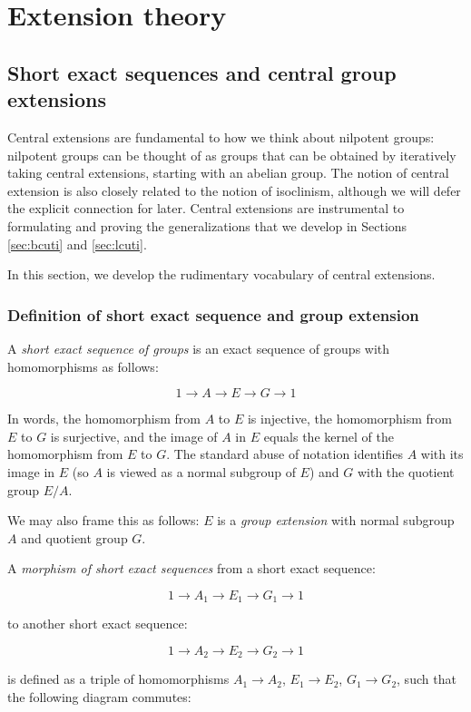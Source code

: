 \documentclass{ucetd}
\begin{document}
\chapter{Extension theory}

\section{Short exact sequences and central group extensions}\label{sec:ses-group}

Central extensions are fundamental to how we think about nilpotent
groups: nilpotent groups can be thought of as groups that can be
obtained by iteratively taking central extensions, starting with an
abelian group. The notion of central extension is also closely related
to the notion of isoclinism, although we will defer the explicit
connection for later. Central extensions are instrumental to
formulating and proving the generalizations that we develop in
Sections \ref{sec:bcuti} and \ref{sec:lcuti}.

In this section, we develop the rudimentary vocabulary of central
extensions.

\subsection{Definition of short exact sequence and group extension}

A {\em short exact sequence of groups} is an exact sequence of groups
with homomorphisms as follows:

$$1 \to A \to E \to G \to 1$$

In words, the homomorphism from $A$ to $E$ is injective, the
homomorphism from $E$ to $G$ is surjective, and the image of $A$ in
$E$ equals the kernel of the homomorphism from $E$ to $G$. The
standard abuse of notation identifies $A$ with its image in $E$ (so
$A$ is viewed as a normal subgroup of $E$) and $G$ with the quotient
group $E/A$.

We may also frame this as follows: $E$ is a {\em group extension} with
normal subgroup $A$ and quotient group $G$.

A {\em morphism of short exact sequences} from a short exact sequence:

$$1 \to A_1 \to E_1 \to G_1 \to 1$$

to another short exact sequence:

$$1 \to A_2 \to E_2 \to G_2 \to 1$$

is defined as a triple of homomorphisms $A_1 \to A_2$, $E_1 \to E_2$,
$G_1 \to G_2$, such that the following diagram commutes:
\end{document}
